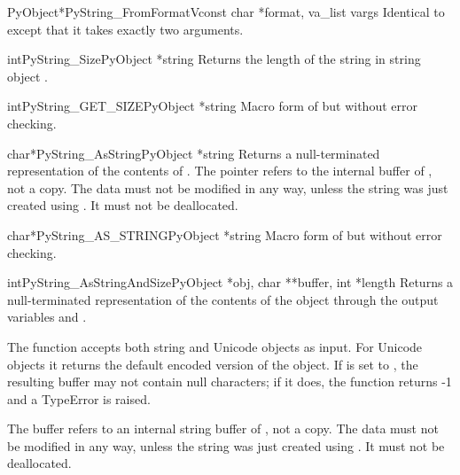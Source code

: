 \documentclass{manual}
\begin{document}
\begin{cfuncdesc}{PyObject*}{PyString_FromFormatV}{const char *format,
                                                   va_list vargs}
Identical to  except that it takes
exactly two arguments.
\end{cfuncdesc}

\begin{cfuncdesc}{int}{PyString_Size}{PyObject *string}
Returns the length of the string in string object .
\end{cfuncdesc}

\begin{cfuncdesc}{int}{PyString_GET_SIZE}{PyObject *string}
Macro form of  but without error
checking.
\end{cfuncdesc}

\begin{cfuncdesc}{char*}{PyString_AsString}{PyObject *string}
Returns a null-terminated representation of the contents of
.  The pointer refers to the internal buffer of
, not a copy.  The data must not be modified in any way,
unless the string was just created using
.
It must not be deallocated.
\end{cfuncdesc}

\begin{cfuncdesc}{char*}{PyString_AS_STRING}{PyObject *string}
Macro form of  but without error
checking.
\end{cfuncdesc}

\begin{cfuncdesc}{int}{PyString_AsStringAndSize}{PyObject *obj,
                                                 char **buffer,
                                                 int *length}
Returns a null-terminated representation of the contents of the object
 through the output variables  and .

The function accepts both string and Unicode objects as input. For
Unicode objects it returns the default encoded version of the object.
If  is set to \NULL{}, the resulting buffer may not contain
null characters; if it does, the function returns -1 and a
TypeError is raised.

The buffer refers to an internal string buffer of , not a
copy. The data must not be modified in any way, unless the string was
just created using .  It must not be deallocated.
\end{cfuncdesc}
\end{document}
